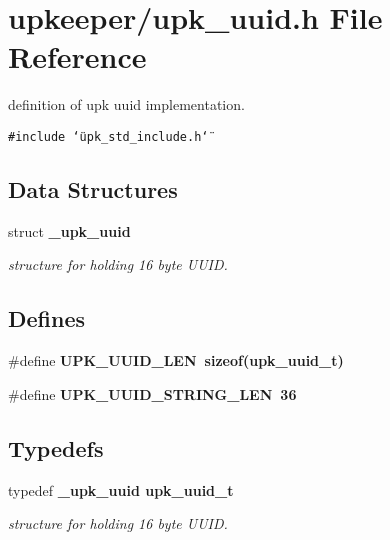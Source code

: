 \section{upkeeper/upk\_\-uuid.h File Reference}
\label{upk__uuid_8h}
definition of upk uuid implementation. 

{\tt \#include \char`\"{}upk\_\-std\_\-include.h\char`\"{}}\par
\subsection*{Data Structures}
\begin{CompactItemize}
\item 
struct \bf{\_\-upk\_\-uuid}
\begin{CompactList}\small\item\em structure for holding 16 byte UUID. \item\end{CompactList}\end{CompactItemize}
\subsection*{Defines}
\begin{CompactItemize}
\item 
\#define \bf{UPK\_\-UUID\_\-LEN}~sizeof(\bf{upk\_\-uuid\_\-t})
\item 
\#define \bf{UPK\_\-UUID\_\-STRING\_\-LEN}~36
\end{CompactItemize}
\subsection*{Typedefs}
\begin{CompactItemize}
\item 
typedef \bf{\_\-upk\_\-uuid} \bf{upk\_\-uuid\_\-t}
\begin{CompactList}\small\item\em structure for holding 16 byte UUID. \item\end{CompactList}\end{CompactItemize}
